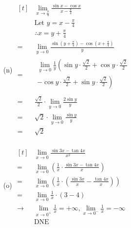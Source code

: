 \documentclass{article}
\begin{document}
\begin{multicols}{2}
\begin{itemize}
\item[(n)] 
$\begin{aligned}[t]
	&\lim\limits_{x\to\frac{\pi}{4}}\frac{\sin x-\cos x}{x-\frac{\pi}{4}} \\
	&\text{Let }y=x-\frac{\pi}{4} \\
	&\therefore x=y+\frac{\pi}{4} \\
	=&\lim\limits_{y\to0}\frac{\sin\left(y+\frac{\pi}{4}\right)-\cos\left(x+\frac{\pi}{4}\right)}{y} \\
	=&\begin{aligned}
		\lim\limits_{y\to0}\frac{1}{y}\left(\sin y\cdot\frac{\sqrt{2}}{2}+\cos y\cdot\frac{\sqrt{2}}{2}\right. \\
		\left.-\cos y\cdot\frac{\sqrt{2}}{2}+\sin y\cdot\frac{\sqrt{2}}{2}\right) \\
	\end{aligned} \\
	=&\frac{\sqrt{2}}{2}\cdot\lim\limits_{y\to0}\frac{2\sin y}{y} \\
	=&\sqrt{2}\cdot\lim\limits_{y\to0}\frac{\sin y}{y} \\
	=&\boxed{\sqrt{2}} \\
\end{aligned}$

\item[(o)] 
$\begin{aligned}[t]
	&\lim\limits_{x\to0}\frac{\sin3x-\tan4x}{x^2} \\
	=&\lim\limits_{x\to0}\left(\frac{1}{x}\cdot\frac{\sin3x-\tan4x}{x}\right) \\
	=&\lim\limits_{x\to0}\left(\frac{1}{x}\cdot\left(\frac{\sin3x}{x}-\frac{\tan4x}{x}\right)\right) \\
	=&\lim\limits_{x\to0}\frac{1}{x}\cdot\left(3-4\right) \\
	\rightarrow&\lim\limits_{x\to0^+}\frac{1}{x}=+\infty, \lim\limits_{x\to0^-}\frac{1}{x}=-\infty \\
	&\boxed{\text{DNE}}
\end{aligned}$


\end{itemize}
\end{multicols}
\end{document}
